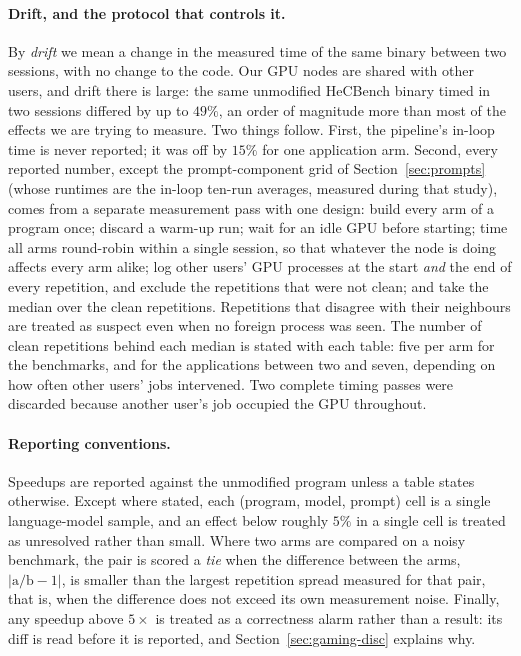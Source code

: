 \paragraph{Drift, and the protocol that controls it.}
By \emph{drift} we mean a change in the measured time of the same binary between two sessions, with no
change to the code. Our GPU nodes are shared with other users, and drift there is large: the same
unmodified HeCBench binary timed in two sessions differed by up to $49\%$, an order of magnitude more
than most of the effects we are trying to measure. Two things follow. First, the pipeline's in-loop
time is never reported; it was off by $15\%$ for one application arm. Second, every reported number,
except the prompt-component grid of Section~\ref{sec:prompts} (whose runtimes are the in-loop
ten-run averages, measured during that study), comes from a separate measurement pass with one design:
build every arm of a program once; discard a warm-up run; wait for an idle GPU before starting; time
all arms round-robin within a single session, so that whatever the node is doing affects every arm
alike; log other users' GPU processes at the start \emph{and} the end of every repetition, and exclude
the repetitions that were not clean; and take the median over the clean repetitions. Repetitions that
disagree with their neighbours are treated as suspect even when no foreign process was seen. The number
of clean repetitions behind each median is stated with each table: five per arm for the benchmarks, and
for the applications between two and seven, depending on how often other users' jobs intervened. Two
complete timing passes were discarded because another user's job occupied the GPU throughout.

\paragraph{Reporting conventions.}
Speedups are reported against the unmodified program unless a table states otherwise. Except where
stated, each (program, model, prompt) cell is a single language-model sample, and an effect below
roughly $5\%$ in a single cell is treated as unresolved rather than small. Where two arms are compared
on a noisy benchmark, the pair is scored a \emph{tie} when the difference between the arms,
$|\mathrm{a}/\mathrm{b}-1|$, is smaller than the largest repetition spread measured for that pair,
that is, when the difference does not exceed its own measurement noise. Finally, any speedup above
$5\times$ is treated as a correctness alarm rather than a result: its diff is read before it is
reported, and Section~\ref{sec:gaming-disc} explains why.
